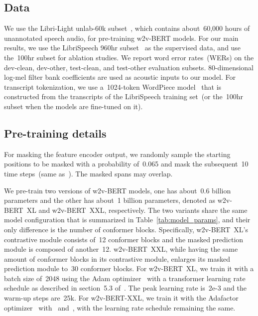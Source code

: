 \documentclass{article}
\begin{document}
\subsection{Data}
We use the Libri-Light unlab-60k subset~\cite{kahn2020libri}, which contains about~60,000 hours of unannotated speech audio, for pre-training w2v-BERT models.
For our main results, we use the LibriSpeech 960hr subset~\cite{panayotov2015librispeech} as the supervised data, and use the~100hr subset for ablation studies.
We report word error rates~(WERs) on the dev-clean, dev-other, test-clean, and test-other evaluation subsets.
80-dimensional log-mel filter bank coefficients are used as acoustic inputs to our model.
For transcript tokenization, we use a~1024-token WordPiece model~\cite{schuster2012japanese} that is constructed from the transcripts of the LibriSpeech training set~(or the~100hr subset when the models are fine-tuned on it).

\subsection{Pre-training details}
 For masking the feature encoder output, we randomly sample the starting positions to be masked with a probability of~0.065 and mask the subsequent~10 time steps~(same as~\cite{baevski2020wav2vec,zhang2020pushing}).
The masked spans may overlap.

 We pre-train two versions of w2v-BERT models, one has about~0.6 billion parameters and the other has about~1 billion parameters, denoted as w2v-BERT~XL and w2v-BERT~XXL, respectively.
The two variants share the same model configuration that is summarized in Table~\ref{tab:model_params}, and their only difference is the number of conformer blocks.
Specifically, w2v-BERT~XL's contrastive module consists of~12 conformer blocks and the masked prediction module is composed of another~12.
w2v-BERT~XXL, while having the same amount of conformer blocks in its contrastive module, enlarges its masked prediction module to~30 conformer blocks.
For w2v-BERT~XL, we train it with a batch size of~2048 using the Adam optimizer~\cite{kingma2015adam} with a transformer learning rate schedule as described in section~5.3 of~\cite{vaswani2017attention}.
The peak learning rate is~2e-3 and the warm-up steps are~25k.
For w2v-BERT-XXL, we train it with the Adafactor optimizer~\cite{shazeer2018adafactor} with~ and~, with the learning rate schedule remaining the same.
\end{document}
